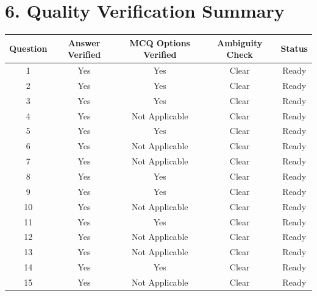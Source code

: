 \documentclass[11pt]{article}
\begin{document}
\section*{6. Quality Verification Summary}

\begin{longtable}{|c|c|c|c|c|}
\hline
\textbf{Question} & \textbf{Answer Verified} & \textbf{MCQ Options Verified} & \textbf{Ambiguity Check} & \textbf{Status} \\ \hline
1 & Yes & Yes & Clear & Ready \\ \hline
2 & Yes & Yes & Clear & Ready \\ \hline
3 & Yes & Yes & Clear & Ready \\ \hline
4 & Yes & Not Applicable & Clear & Ready \\ \hline
5 & Yes & Yes & Clear & Ready \\ \hline
6 & Yes & Not Applicable & Clear & Ready \\ \hline
7 & Yes & Not Applicable & Clear & Ready \\ \hline
8 & Yes & Yes & Clear & Ready \\ \hline
9 & Yes & Yes & Clear & Ready \\ \hline
10 & Yes & Not Applicable & Clear & Ready \\ \hline
11 & Yes & Yes & Clear & Ready \\ \hline
12 & Yes & Not Applicable & Clear & Ready \\ \hline
13 & Yes & Not Applicable & Clear & Ready \\ \hline
14 & Yes & Yes & Clear & Ready \\ \hline
15 & Yes & Not Applicable & Clear & Ready \\ \hline
\end{longtable}
\end{document}
